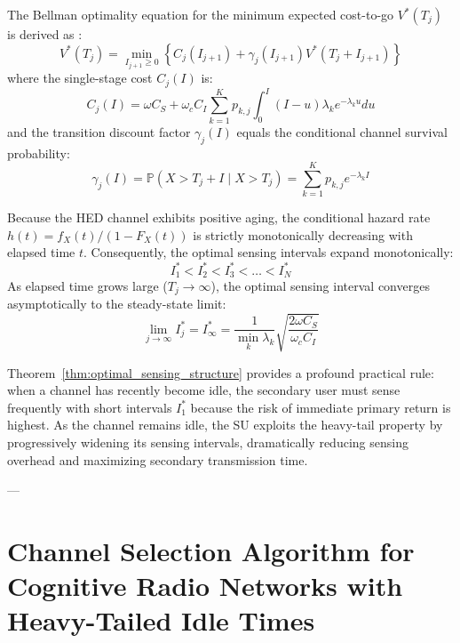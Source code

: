 The Bellman optimality equation for the minimum expected cost-to-go $V^*(T_j)$ is derived as \cite{senthilmurugan2017optimal}:
\begin{equation}
    \label{eq:cr_bellman_sensing}
    V^*(T_j) = \min_{I_{j+1} \ge 0} \left\{ C_j(I_{j+1}) + \gamma_j(I_{j+1}) V^*(T_j + I_{j+1}) \right\}
\end{equation}
where the single-stage cost $C_j(I)$ is:
\begin{equation}
    C_j(I) = \omega C_S + \omega_c C_I \sum_{k=1}^K p_{k, j} \int_0^I (I - u) \lambda_k e^{-\lambda_k u} du
\end{equation}
and the transition discount factor $\gamma_j(I)$ equals the conditional channel survival probability:
\begin{equation}
    \gamma_j(I) = \mathbb{P}(X > T_j + I \mid X > T_j) = \sum_{k=1}^K p_{k, j} e^{-\lambda_k I}
\end{equation}

\begin{theorem}
\label{thm:optimal_sensing_structure}
Because the HED channel exhibits positive aging, the conditional hazard rate $h(t) = f_X(t)/(1 - F_X(t))$ is strictly monotonically decreasing with elapsed time $t$. Consequently, the optimal sensing intervals expand monotonically:
\begin{equation}
    I_1^* < I_2^* < I_3^* < \dots < I_N^*
\end{equation}
As elapsed time grows large ($T_j \to \infty$), the optimal sensing interval converges asymptotically to the steady-state limit:
\begin{equation}
    \lim_{j \to \infty} I_j^* = I_\infty^* = \frac{1}{\min_k \lambda_k} \sqrt{\frac{2 \omega C_S}{\omega_c C_I}}
\end{equation}
\end{theorem}

Theorem~\ref{thm:optimal_sensing_structure} provides a profound practical rule: when a channel has recently become idle, the secondary user must sense frequently with short intervals $I_1^*$ because the risk of immediate primary return is highest. As the channel remains idle, the SU exploits the heavy-tail property by progressively widening its sensing intervals, dramatically reducing sensing overhead and maximizing secondary transmission time.

---

\section{Channel Selection Algorithm for Cognitive Radio Networks with Heavy-Tailed Idle Times}
\label{sec:cr_channel_selection}

